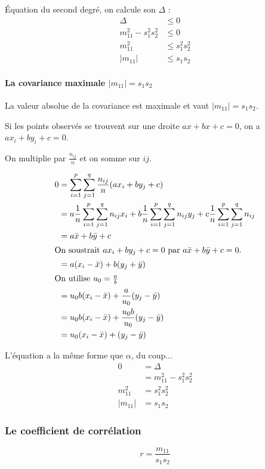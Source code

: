 Équation du second degré, on calcule son $\Delta$ :
\begin{align*}
\Delta &\leq 0\\
m_{11}^2-s_1^2s_2^2 &\leq 0\\
m_{11}^2 &\leq s_1^2s_2^2\\
|m_{11}| &\leq s_1s_2
\end{align*}





\paragraph{La covariance maximale $|m_{11}| = s_1s_2$}

La valeur absolue de la covariance est maximale et vaut $|m_{11}| = s_1s_2$.

Si les points observés se trouvent sur une droite $ax+bx+c=0$, on a $ax_i+by_i+c=0$.

On multiplie par $\frac{n_{ij}}{n}$ et on somme sur $ij$.

\begin{align*}
0  &= \sum_{i=1}^{p} \sum_{j=1}^{q} \frac{n_{ij}}{n}(ax_i+by_j+c) \\
   &= a \frac{1}{n} \sum_{i=1}^{p} \sum_{j=1}^{q}n_{ij}x_i + b \frac{1}{n} \sum_{i=1}^{p} \sum_{j=1}^{q}n_{ij}y_j + c \frac{1}{n} \sum_{i=1}^{p} \sum_{j=1}^{q}n_{ij}\\
   &= a\bar{x}+b\bar{y}+c\\
\intertext{On soustrait $ax_i+by_j+c=0$ par $a\bar{x}+b\bar{y}+c = 0$.}
   &= a(x_i-\bar{x})+b(y_j+\bar{y})\\
\intertext{On utilise $u_0=\frac{a}{b}$}
   &= u_0b(x_i-\bar{x})+\frac{a}{u_0}(y_j-\bar{y})\\
   &= u_0b(x_i-\bar{x})+\frac{u_0b}{u_0}(y_j-\bar{y})\\
   &= u_0(x_i-\bar{x})+(y_j-\bar{y})
\end{align*}

L'équation a la même forme que $\alpha$, du coup...
\begin{align*}
0  &= \Delta\\
        &= m_{11}^2-s_1^2s_2^2\\
m_{11}^2 &= s_1^2s_2^2\\
|m_{11}| &= s_1s_2
\end{align*}




\subsubsection{Le coefficient de corrélation}
$$\boxed{r=\frac{m_{11}}{s_1s_2}}$$







